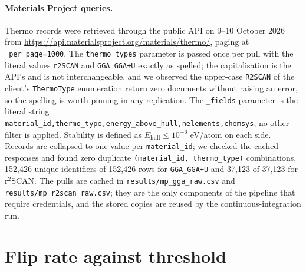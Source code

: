 \documentclass[11pt]{article}
\begin{document}
\paragraph{Materials Project queries.} Thermo records were retrieved through the public
API on 9--10 October 2026 from
\url{https://api.materialsproject.org/materials/thermo/}, paging at
\texttt{\_per\_page=1000}. The \texttt{thermo\_types} parameter is passed once per pull
with the literal values \texttt{r2SCAN} and \texttt{GGA\_GGA+U} exactly as spelled; the
capitalisation is the API's and is not interchangeable, and we observed the upper-case
\texttt{R2SCAN} of the client's \texttt{ThermoType} enumeration return zero documents
without raising an error, so the spelling is worth pinning in any replication. The
\texttt{\_fields} parameter is the literal string
\texttt{material\_id,thermo\_type,energy\_above\_hull,nelements,chemsys}; no other filter
is applied. Stability is defined as $E_{\text{hull}} \le 10^{-6}$ eV/atom on each side.
Records are collapsed to one value per \texttt{material\_id}; we checked the cached
responses and found zero duplicate \texttt{(material\_id, thermo\_type)} combinations,
152{,}426 unique identifiers of 152{,}426 rows for \texttt{GGA\_GGA+U} and 37{,}123 of
37{,}123 for r$^2$SCAN. The pulls are cached in \texttt{results/mp\_gga\_raw.csv} and
\texttt{results/mp\_r2scan\_raw.csv}; they are the only components of the pipeline that
require credentials, and the stored copies are reused by the continuous-integration run.

\section{Flip rate against threshold}\label{app:threshold}
\end{document}

